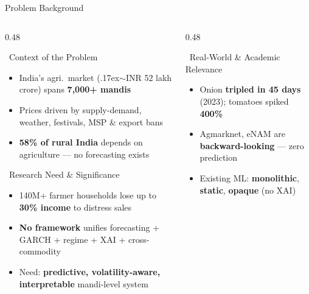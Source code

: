 \documentclass{beamer}
\begin{document}
\begin{frame}[label=bg]{Problem Background}
\vspace{-0.15cm}
\hypertarget{motivation}{}%

\begin{columns}[T]
\begin{column}{0.48\textwidth}

\begin{infocard}{~Context of the Problem}
\fontsize{6pt}{7pt}\selectfont
\begin{itemize}\setlength\itemsep{1pt}
  \item India's agri.\ market ({\raise.17ex\hbox{$\scriptstyle\sim$}}INR 52 lakh crore) spans \textbf{7,000+ mandis}
  \item Prices driven by supply-demand, weather, festivals, MSP \& export bans
  \item \textbf{58\% of rural India} depends on agriculture --- no forecasting exists
\end{itemize}
\end{infocard}

\vspace{0.02cm}

\begin{alertcard}{~Research Need \& Significance}
\fontsize{6pt}{7pt}\selectfont
\begin{itemize}\setlength\itemsep{1pt}
  \item 140M+ farmer households lose up to \textbf{30\% income} to distress sales
  \item \textbf{No framework} unifies forecasting + GARCH + regime + XAI + cross-commodity
  \item Need: \textbf{predictive, volatility-aware, interpretable} mandi-level system
\end{itemize}
\end{alertcard}

\end{column}
\begin{column}{0.48\textwidth}

\begin{purplecard}{~Real-World \& Academic Relevance}
\fontsize{6pt}{7pt}\selectfont
\begin{itemize}\setlength\itemsep{1pt}
  \item Onion \textbf{tripled in 45 days} (2023); tomatoes spiked \textbf{400\%}
  \item Agmarknet, eNAM are \textbf{backward-looking} --- zero prediction
  \item Existing ML: \textbf{monolithic}, \textbf{static}, \textbf{opaque} (no XAI)
\end{itemize}
\end{purplecard}


\end{column}
\end{columns}
\end{frame}
\end{document}
